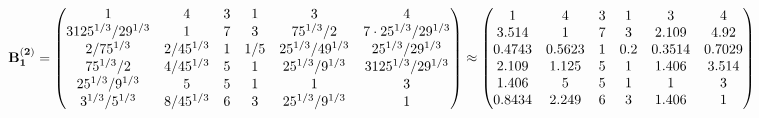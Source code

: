 \documentclass[10pt,a4paper]{article}
\begin{document}
	\[
		\bold{B_1^{(2)}} = 
		\begin{pmatrix}
			{1}{} & {{4}}{} & {{3}}{} & {1}{} & {{3}}{} & {{4}}{} \\
			{{3125^ {1 / 3}}} / {{2}{9^ {1 / 3}}} & {1}{} & {{7}}{} & {{3}}{} & {{75^ {1 / 3}}} / {{2}} & {{7} \cdot {25^ {1 / 3}}} / {{2}{9^ {1 / 3}}} \\
			{{2}} / {{75^ {1 / 3}}} & {{2}} / {{45^ {1 / 3}}} & {1}{} & {1} / {{5}} & {{25^ {1 / 3}}} / {{4}{9^ {1 / 3}}} & {{25^ {1 / 3}}} / {{2}{9^ {1 / 3}}} \\
			{{75^ {1 / 3}}} / {{2}} & {{4}} / {{45^ {1 / 3}}} & {{5}}{} & {1}{} & {{25^ {1 / 3}}} / {{9^ {1 / 3}}} & {{3125^ {1 / 3}}} / {{2}{9^ {1 / 3}}} \\
			{{25^ {1 / 3}}} / {{9^ {1 / 3}}} & {{5}}{} & {{5}}{} & {1}{} & {1}{} & {{3}}{} \\
			{{3^ {1 / 3}}} / {{5^ {1 / 3}}} & {{8}} / {{45^ {1 / 3}}} & {{6}}{} & {{3}}{} & {{25^ {1 / 3}}} / {{9^ {1 / 3}}} & {1}{} \\
		\end{pmatrix}
		\approx
		\begin{pmatrix}
			1        & 4        & 3        & 1        & 3        & 4        \\
			3.514    & 1        & 7        & 3        & 2.109    & 4.92     \\
			0.4743   & 0.5623   & 1        & 0.2      & 0.3514   & 0.7029   \\
			2.109    & 1.125    & 5        & 1        & 1.406    & 3.514    \\
			1.406    & 5        & 5        & 1        & 1        & 3        \\
			0.8434   & 2.249    & 6        & 3        & 1.406    & 1        \\
		\end{pmatrix}
	\]
\end{document}
